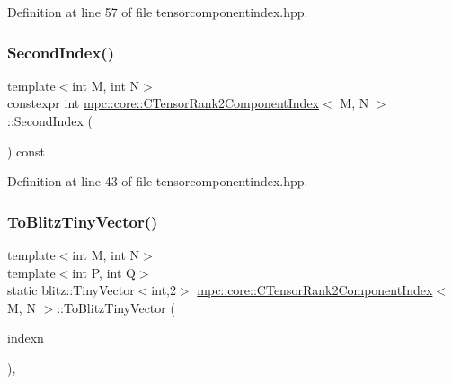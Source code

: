 Definition at line 57 of file tensorcomponentindex.\+hpp.

\mbox{\label{classmpc_1_1core_1_1_c_tensor_rank2_component_index_a442ae55dfc043f4b1d2bca60575f871d}} 
\subsubsection{\texorpdfstring{Second\+Index()}{SecondIndex()}}
{\footnotesize\ttfamily template$<$int M, int N$>$ \\
constexpr int \mbox{\hyperlink{classmpc_1_1core_1_1_c_tensor_rank2_component_index}{mpc\+::core\+::\+C\+Tensor\+Rank2\+Component\+Index}}$<$ M, N $>$\+::Second\+Index (\begin{DoxyParamCaption}{ }\end{DoxyParamCaption}) const\hspace{0.3cm}{\ttfamily [inline]}}



Definition at line 43 of file tensorcomponentindex.\+hpp.

\mbox{\label{classmpc_1_1core_1_1_c_tensor_rank2_component_index_afc534a2e0322c3dc71904e4b02a221ea}} 
\subsubsection{\texorpdfstring{To\+Blitz\+Tiny\+Vector()}{ToBlitzTinyVector()}}
{\footnotesize\ttfamily template$<$int M, int N$>$ \\
template$<$int P, int Q$>$ \\
static blitz\+::\+Tiny\+Vector$<$int,2$>$ \mbox{\hyperlink{classmpc_1_1core_1_1_c_tensor_rank2_component_index}{mpc\+::core\+::\+C\+Tensor\+Rank2\+Component\+Index}}$<$ M, N $>$\+::To\+Blitz\+Tiny\+Vector (\begin{DoxyParamCaption}\item[{const \mbox{\hyperlink{classmpc_1_1core_1_1_c_tensor_rank2_component_index}{C\+Tensor\+Rank2\+Component\+Index}}$<$ P, Q $>$ \&}]{indexn }\end{DoxyParamCaption})\hspace{0.3cm}{\ttfamily [inline]}, {\ttfamily [static]}}



